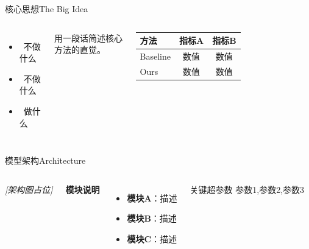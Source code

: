 

\begin{frame}{核心思想}{The Big Idea}
  \begin{columns}[T, onlytextwidth]
      \begin{itemize}
        \item \xmark\ 不做什么
        \item \xmark\ 不做什么
        \item \cmark\ \alert{做什么}
      \end{itemize}

      \vspace{0.5em}
      \footnotesize
      用一段话简述核心方法的直觉。
      \begin{table}
        \centering\small
        \begin{tabular}{lcc}
          \toprule
          \textbf{方法} & \textbf{指标A} & \textbf{指标B} \\
          \midrule
          Baseline & 数值 & 数值 \\
          \alert{Ours} & \alert{数值} & \alert{数值} \\
          \bottomrule
        \end{tabular}
      \end{table}
  \end{columns}
\end{frame}

\begin{frame}{模型架构}{Architecture}
  \begin{columns}[T, onlytextwidth]
      \begin{center}
        {\Large\color{mustgray}\itshape [架构图占位]}
      \end{center}
      \textbf{\color{mustblue}模块说明}
      \begin{itemize}
        \item \textcolor{mustblue}{\textbf{模块A}}：描述
        \item \textcolor{mustteal}{\textbf{模块B}}：描述
        \item \textcolor{mustred}{\textbf{模块C}}：描述
      \end{itemize}

      \vspace{0.5em}
      \begin{block}{关键超参数}
        \footnotesize
        参数1,\quad 参数2,\quad 参数3
      \end{block}
  \end{columns}
\end{frame}

